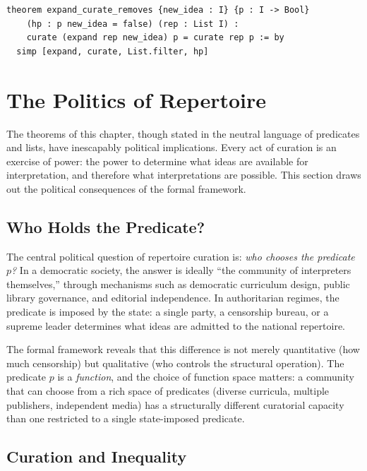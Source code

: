 \begin{lstlisting}[caption={Expand-then-curate in Lean~4}]
theorem expand_curate_removes {new_idea : I} {p : I -> Bool}
    (hp : p new_idea = false) (rep : List I) :
    curate (expand rep new_idea) p = curate rep p := by
  simp [expand, curate, List.filter, hp]
\end{lstlisting}

\section{The Politics of Repertoire}
\label{sec:ch15-politics}

The theorems of this chapter, though stated in the neutral language of
predicates and lists, have inescapably political implications.  Every act
of curation is an exercise of power: the power to determine what ideas
are available for interpretation, and therefore what interpretations are
possible.  This section draws out the political consequences of the
formal framework.

\subsection{Who Holds the Predicate?}

The central political question of repertoire curation is: \emph{who
chooses the predicate $p$?}  In a democratic society, the answer is
ideally ``the community of interpreters themselves,'' through mechanisms
such as democratic curriculum design, public library governance, and
editorial independence.  In authoritarian regimes, the predicate is
imposed by the state: a single party, a censorship bureau, or a
supreme leader determines what ideas are admitted to the national
repertoire.

The formal framework reveals that this difference is not merely
quantitative (how much censorship) but qualitative (who controls the
structural operation).  The predicate $p$ is a \emph{function}, and the
choice of function space matters: a community that can choose from a
rich space of predicates (diverse curricula, multiple publishers,
independent media) has a structurally different curatorial capacity than
one restricted to a single state-imposed predicate.

\subsection{Curation and Inequality}

